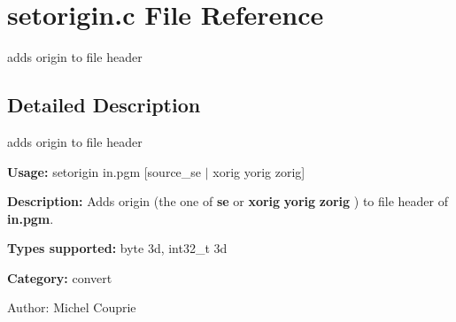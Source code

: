 \section{setorigin.c File Reference}
\label{setorigin_8c}
adds origin to file header 



\subsection{Detailed Description}
adds origin to file header 

{\bf Usage:} setorigin in.pgm [source\_\-se $|$ xorig yorig zorig]

{\bf Description:} Adds origin (the one of {\bf se} or {\bf xorig} {\bf yorig} {\bf zorig} ) to file header of {\bf in.pgm}.

{\bf Types supported:} byte 3d, int32\_\-t 3d

{\bf Category:} convert

\begin{Desc}
\item[Author:]Michel Couprie \end{Desc}
